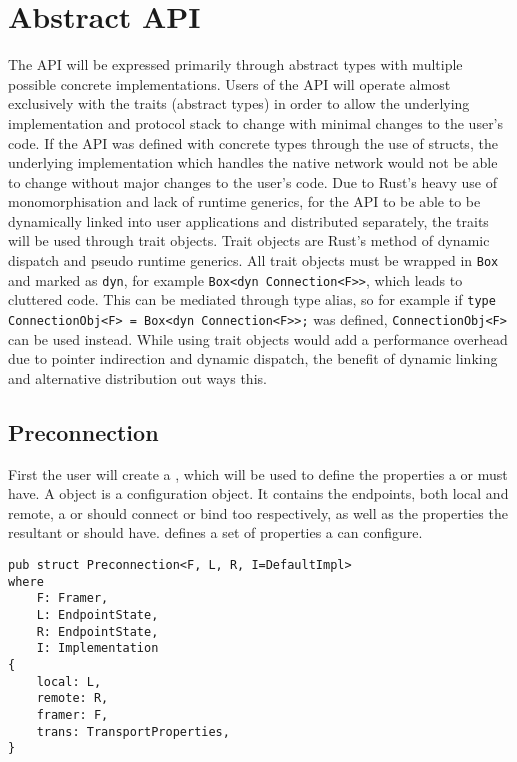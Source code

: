 \section{Abstract API}\label{sec:abstract-api}
The API will be expressed primarily through abstract types with multiple possible concrete implementations.
Users of the API will operate almost exclusively with the traits (abstract types) in order to allow the underlying
implementation and protocol stack to change with minimal changes to the user's code.
If the API was defined with concrete types through the use of structs, the underlying implementation which handles
the native network would not be able to change without major changes to the user's code.
Due to Rust's heavy use of monomorphisation and lack of runtime generics, for the API to be able to be dynamically
linked into user applications and distributed separately, the traits will be used through trait objects.
Trait objects are Rust's method of dynamic dispatch and pseudo runtime generics.
All trait objects must be wrapped in \texttt{Box} and marked as \texttt{dyn}, for example
\texttt{Box<dyn Connection<F>>}, which leads to cluttered code.
This can be mediated through type alias, so for example if \texttt{type ConnectionObj<F> = Box<dyn Connection<F>>;} was
defined, \texttt{ConnectionObj<F>} can be used instead.
While using trait objects would add a performance overhead due to pointer indirection and dynamic dispatch, the benefit
of dynamic linking and alternative distribution out ways this.

\subsection{Preconnection}\label{subsec:preconnection}
First the user will create a \preconnection{}, which will be used to define the properties a \connection or \listener
must have.
A \preconnection{} object is a configuration object.
It contains the endpoints, both local and remote, a \connection{} or \listener{} should connect or bind too
respectively, as well as the properties the resultant \connection{} or \listener{} should have.
\cite[§~5.2]{trammell_abstractapplicationlayer_2020} defines a set of properties a \preconnection{} can configure.

\begin{lstlisting}[float=h, label=lst:preconnection, caption={The Preconnection struct, showing the four
generic parameters.}]
pub struct Preconnection<F, L, R, I=DefaultImpl>
where
    F: Framer,
    L: EndpointState,
    R: EndpointState,
    I: Implementation
{
    local: L,
    remote: R,
    framer: F,
    trans: TransportProperties,
}
\end{lstlisting}

